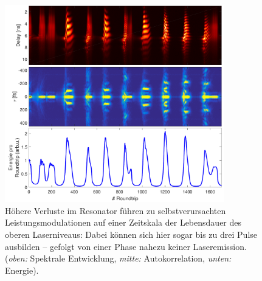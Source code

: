 \documentclass[bachelor,       %
               twoside,        %
               BCOR10mm,       %
               liststotoc,nomtotoc,bibtotoc, %
               english,ngerman, %
               final,          %
               ]{GAUBM}
\begin{document}
\begin{figure}[!htb]
   \centering
   \includegraphics[width=0.85\textwidth]{figures/4ms_25GSA_400m_MLrun_ZitternHeftig_239100}
   \caption{Höhere Verluste im Resonator führen zu selbstverursachten Leistungsmodulationen auf einer Zeitskala der Lebensdauer des oberen Laserniveaus:
   Dabei können sich hier sogar bis zu drei Pulse ausbilden -- gefolgt von einer Phase nahezu keiner Laseremission. 
   (\textit{oben:} Spektrale Entwicklung, \textit{mitte:} Autokorrelation, \textit{unten:} Energie).}
   \label{fig:SelfQSwitch}
\end{figure}
\end{document}
